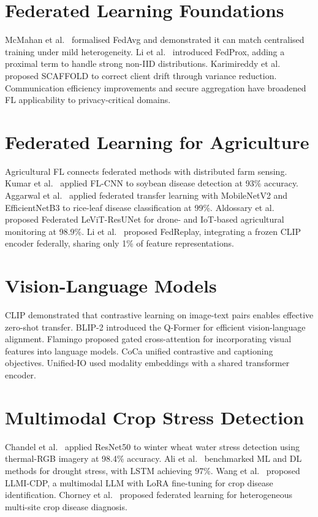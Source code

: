 \documentclass[12pt, a4paper, oneside]{Thesis}
\begin{document}
\section{Federated Learning Foundations}
McMahan et al.\ \cite{McMahan2017} formalised FedAvg and demonstrated it can match centralised training under mild heterogeneity. Li et al.\ \cite{Li2020} introduced FedProx, adding a proximal term to handle strong non-IID distributions. Karimireddy et al.\ \cite{Karimireddy2020} proposed SCAFFOLD to correct client drift through variance reduction. Communication efficiency improvements and secure aggregation \cite{bonawitz2017practical} have broadened FL applicability to privacy-critical domains.

\section{Federated Learning for Agriculture}
Agricultural FL connects federated methods with distributed farm sensing. Kumar et al.\ \cite{Kumar2024} applied FL-CNN to soybean disease detection at 93\% accuracy. Aggarwal et al.\ \cite{Aggarwal2023} applied federated transfer learning with MobileNetV2 and EfficientNetB3 to rice-leaf disease classification at 99\%. Aldossary et al.\ \cite{Aldossary2025} proposed Federated LeViT-ResUNet for drone- and IoT-based agricultural monitoring at 98.9\%. Li et al.\ \cite{Li2025} proposed FedReplay, integrating a frozen CLIP encoder federally, sharing only 1\% of feature representations.

\section{Vision-Language Models}
CLIP \cite{Radford2021} demonstrated that contrastive learning on image-text pairs enables effective zero-shot transfer. BLIP-2 \cite{Li2023} introduced the Q-Former for efficient vision-language alignment. Flamingo \cite{Alayrac2022} proposed gated cross-attention for incorporating visual features into language models. CoCa \cite{Yu2022} unified contrastive and captioning objectives. Unified-IO \cite{Lu2022} used modality embeddings with a shared transformer encoder.

\section{Multimodal Crop Stress Detection}
Chandel et al.\ \cite{Chandel2022} applied ResNet50 to winter wheat water stress detection using thermal-RGB imagery at 98.4\% accuracy. Ali et al.\ \cite{Ali2024} benchmarked ML and DL methods for drought stress, with LSTM achieving 97\%. Wang et al.\ \cite{Long2025} proposed LLMI-CDP, a multimodal LLM with LoRA fine-tuning for crop disease identification. Chorney et al.\ \cite{Xu2025} proposed federated learning for heterogeneous multi-site crop disease diagnosis.
\end{document}
